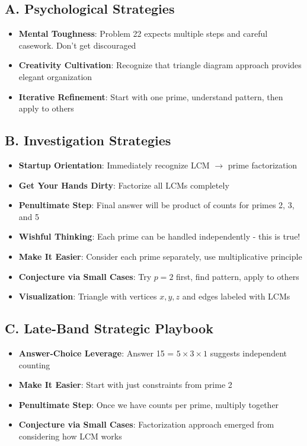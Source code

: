 \documentclass[12pt]{article}
\begin{document}
\begin{strategicbox}
\subsection*{A. Psychological Strategies}
\begin{itemize}[leftmargin=*]
    \item \textbf{Mental Toughness}: Problem 22 expects multiple steps and careful casework. Don't get discouraged
    \item \textbf{Creativity Cultivation}: Recognize that triangle diagram approach provides elegant organization
    \item \textbf{Iterative Refinement}: Start with one prime, understand pattern, then apply to others
\end{itemize}

\subsection*{B. Investigation Strategies}
\begin{itemize}[leftmargin=*]
    \item \textbf{Startup Orientation}: Immediately recognize LCM $\rightarrow$ prime factorization
    \item \textbf{Get Your Hands Dirty}: Factorize all LCMs completely
    \item \textbf{Penultimate Step}: Final answer will be product of counts for primes 2, 3, and 5
    \item \textbf{Wishful Thinking}: Each prime can be handled independently - this is true!
    \item \textbf{Make It Easier}: Consider each prime separately, use multiplicative principle
    \item \textbf{Conjecture via Small Cases}: Try $p=2$ first, find pattern, apply to others
    \item \textbf{Visualization}: Triangle with vertices $x,y,z$ and edges labeled with LCMs
\end{itemize}

\subsection*{C. Late-Band Strategic Playbook}
\begin{itemize}[leftmargin=*]
    \item \textbf{Answer-Choice Leverage}: Answer 15 = $5 \times 3 \times 1$ suggests independent counting
    \item \textbf{Make It Easier}: Start with just constraints from prime 2
    \item \textbf{Penultimate Step}: Once we have counts per prime, multiply together
    \item \textbf{Conjecture via Small Cases}: Factorization approach emerged from considering how LCM works
\end{itemize}
\end{strategicbox}
\end{document}
